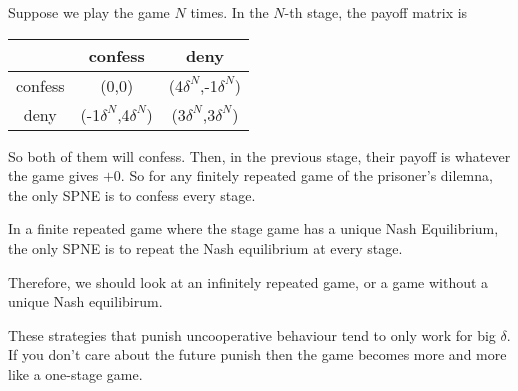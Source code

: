 Suppose we play the game $N$ times. In the $N$-th stage, the payoff matrix is 
\begin{center}
    \begin{tabular}{|c|c c|}
        \hline & confess & deny \\
        \hline 
        confess & (0,0) & (4$\delta^N$,-1$\delta^N$)\\
        \hline
        deny & (-1$\delta^N$,4$\delta^N$) & (3$\delta^N$,3$\delta^N$)\\\hline
    \end{tabular}
\end{center}
So both of them will confess. Then, in the previous stage, their payoff is whatever the game gives $+0$. So for any finitely repeated game of the prisoner's dilemna, the only SPNE is to confess every stage.
\begin{atheorem}{}{}
    In a finite repeated game where the stage game has a unique Nash Equilibrium, the only SPNE is to repeat the Nash equilibrium at every stage.
\end{atheorem}

Therefore, we should look at an infinitely repeated game, or a game without a unique Nash equilibirum.

These strategies that punish uncooperative behaviour tend to only work for big $\delta$. If you don't care about the future punish then the game becomes more and more like a one-stage game.

